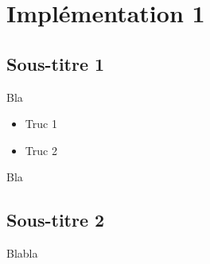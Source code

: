 
\section{Implémentation 1}

	\subsection{Sous-titre 1}

	Bla

	\begin{itemize}
		\item Truc 1
		\item Truc 2
	\end{itemize}

	Bla

	\subsection{Sous-titre 2}

		Blabla